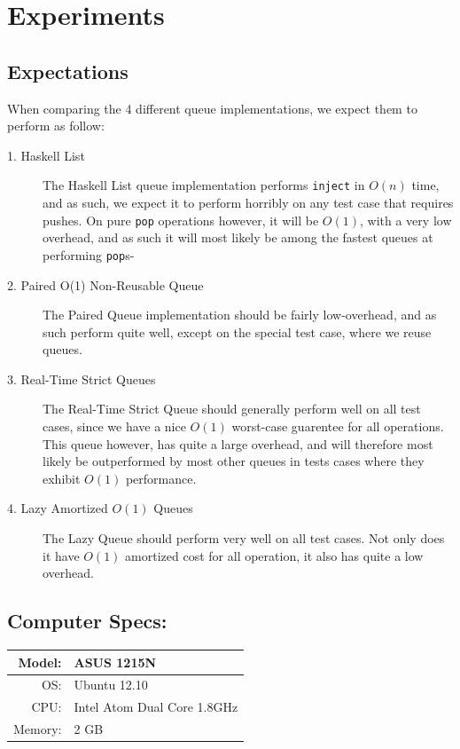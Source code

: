 \section{Experiments}
\subsection{Expectations}
When comparing the 4 different queue implementations, we expect them to perform as follow:
\begin{description}

\item[1. Haskell List]
The Haskell List queue implementation performs \texttt{inject} in $O(n)$ time, and as such, we expect it to perform horribly on any test case that requires pushes.
On pure \texttt{pop} operations however, it will be $O(1)$, with a very low overhead, and as such it will most likely be among the fastest queues at performing \texttt{pop}s-
\item[2. Paired O(1) Non-Reusable Queue]
The Paired Queue implementation should be fairly low-overhead, and as such perform quite well, except on the special test case, where we reuse queues.
\item[3. Real-Time Strict Queues] 
The Real-Time Strict Queue should generally perform well on all test cases, since we have a nice $O(1)$ worst-case guarentee for all operations. This queue however, has quite a large overhead, and will therefore most likely be outperformed by most other queues in tests cases where they exhibit $O(1)$ performance. 
\item[4. Lazy Amortized $O(1)$ Queues]
The Lazy Queue should perform very well on all test cases. Not only does it have $O(1)$ amortized cost for all operation, it also has quite a low overhead. 

\end{description}

\subsection{Computer Specs:}
\begin{tabular}{| r  l |} \hline
Model: &  ASUS 1215N \\ \hline
OS: & Ubuntu 12.10 \\ \hline
CPU: & Intel Atom Dual Core 1.8GHz\\ \hline
Memory: & 2 GB\\ \hline
\end{tabular}

